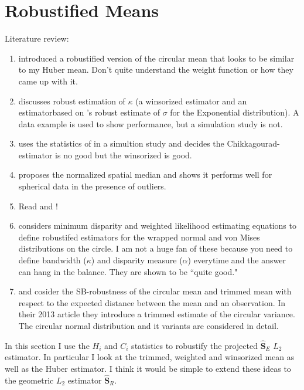 \documentclass{article}\usepackage[]{graphicx}\usepackage[]{color}
\newcommand{\ProjMean}{{\widehat{\bm S}_{E}}}
\newcommand{\GeomMean}{{\widehat{\bm S}_{R}}}
\begin{document}
\section{Robustified Means}

Literature review:
\begin{enumerate}
\item \cite{lenth1981} introduced a robustified version of the circular mean that looks to be similar to my Huber mean.  Don't quite understand the weight function or how they came up with it.
\item \cite{fisher1982} discusses robust estimation of $\kappa$ (a winsorized estimator and an estimatorbased on \cite{chikkagoudar1980}'s robust estimate of $\sigma$ for the Exponential distribution).  A data example is used to show performance, but a simulation study is not.

\item \cite{kimber1985} uses the statistics of \cite{fisher1982} in a simultion study and decides the Chikkagourad-estimator is no good but the winsorized is good.

\item \cite{ducharme1987} proposes the normalized spatial median and shows it performs well for spherical data in the presence of outliers.

\item Read \cite{he1992} and \cite{ko1993}!

\item \cite{agostinelli2007} considers minimum disparity and weighted likelihood estimating equations to define robustifed estimators for the wrapped normal and von Mises distributions on the circle.  I am not a huge fan of these because you need to define bandwidth ($\kappa$) and disparity measure ($\alpha$) everytime and the answer can hang in the balance.  They are shown to be ``quite good."

\item \cite{laha2011} and \cite{laha2013} cosider the SB-robustness of the circular mean and trimmed mean with respect to the expected distance between the mean and an observation.  In their 2013 article they introduce a trimmed estimate of the circular variance.  The circular normal distribution and it variants are considered in detail.
\end{enumerate}

In this section I use the $H_i$ and $C_i$ statistics to robustify the projected $\ProjMean$ $L_2$ estimator.  In particular I look at the trimmed, weighted and winsorized mean as well as the Huber estimator.  I think it would be simple to extend these ideas to the geometric $L_2$ estimator $\GeomMean$.
\end{document}
